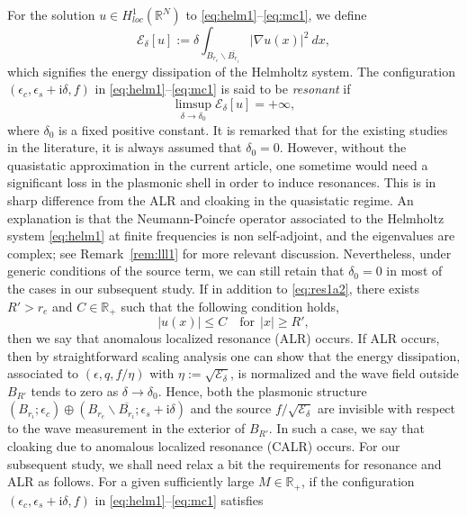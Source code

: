 \documentclass[11pt,reqno,twoside]{amsart}
\theoremstyle{definition}
\theoremstyle{remark}
\numberwithin{equation}{section}
\begin{document}
For the solution $u\in H_{loc}^1(\mathbb{R}^N)$ to \eqref{eq:helm1}--\eqref{eq:mc1}, we define
\begin{equation}\label{eq:energya1}
\mathscr{E}_\delta[u]:=\delta \int_{B_{r_e}\backslash\overline{B_{r_i}}} \left|\nabla u(x) \right|^2\ dx,
\end{equation}
which signifies the energy dissipation of the Helmholtz system. The configuration $(\epsilon_c,\epsilon_s+\mathrm i\delta, f)$ in \eqref{eq:helm1}--\eqref{eq:mc1} is said to be {\it resonant} if
\begin{equation}\label{eq:res1a2}
\limsup_{\delta\rightarrow\delta_0} \mathscr{E}_\delta[u]=+\infty,
\end{equation}
where $\delta_0$ is a fixed positive constant. It is remarked that for the existing studies in the literature, it is always assumed that $\delta_0=0$. However, without the quasistatic approximation in the current article, one sometime would need a significant loss in the plasmonic shell in order to induce resonances. This is in sharp difference from the ALR and cloaking in the quasistatic regime. An explanation is that the Neumann-Poinc\'re operator associated to the Helmholtz system \eqref{eq:helm1} at finite frequencies is non self-adjoint, and the eigenvalues are complex; see Remark~\ref{rem:lll1} for more relevant discussion. Nevertheless, under generic conditions of the source term, we can still retain that $\delta_0=0$ in most of the cases in our subsequent study. If in addition to \eqref{eq:res1a2}, there exists $R'>r_e$ and $C\in\mathbb{R}_+$ such that the following condition holds,
\begin{equation}\label{eq:res2}
|u(x)|\leq C\quad\mbox{for}\ \ |x|\geq R',
\end{equation}
then we say that anomalous localized resonance (ALR) occurs. If ALR occurs, then by straightforward scaling analysis one can show that the energy dissipation, associated to $(\epsilon,q,f/\eta)$ with $\eta:=\sqrt{\mathscr{E}_\delta}$, is normalized and the wave field outside $B_{R'}$ tends to zero as $\delta\rightarrow\delta_0$. Hence, both the plasmonic structure $(B_{r_i}; \epsilon_c)\oplus (B_{r_e}\backslash\overline{B_{r_i}}; \epsilon_s+\mathrm{i}\delta)$ and the source $f/\sqrt{\mathscr{E}_\delta}$ are invisible with respect to the wave measurement in the exterior of $B_{R'}$. In such a case, we say that cloaking due to anomalous localized resonance (CALR) occurs. For our subsequent study, we shall need relax a bit the requirements for resonance and ALR as follows. For a given sufficiently large $M\in\mathbb{R}_+$, if the configuration $(\epsilon_c,\epsilon_s+\mathrm{i}\delta, f)$ in \eqref{eq:helm1}--\eqref{eq:mc1} satisfies 
\end{document}
